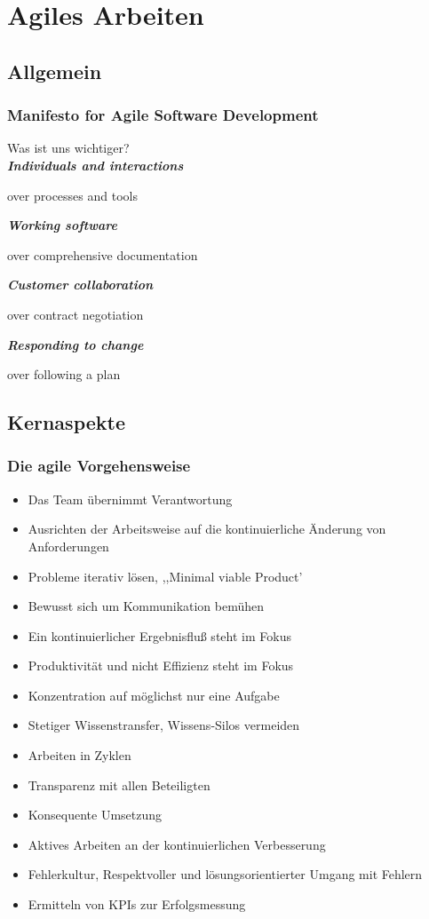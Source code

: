 \section{Agiles Arbeiten}

\subsection{Allgemein}
\frame
{
  \frametitle{Manifesto for Agile Software Development}
  Was ist uns wichtiger?\\
  \bigskip
\textbf{\textit{Individuals and interactions}}
  \begin{flushright}
  over processes and tools
  \end{flushright}
\textbf{\textit{Working software}}
  \begin{flushright}
  over comprehensive documentation
  \end{flushright}
\textbf{\textit{Customer collaboration}}
  \begin{flushright}
  over contract negotiation
  \end{flushright}
\textbf{\textit{Responding to change}}
\small
  \begin{flushright}
  over following a plan\\
  \end{flushright}
\bigskip
\small
\href{http://agilemanifesto.org}{}
\normalsize
}

\subsection{Kernaspekte}
\frame
{
  \frametitle{Die agile Vorgehensweise}
  \begin{itemize}
     \item{Das Team übernimmt Verantwortung}
     \item{Ausrichten der Arbeitsweise auf die kontinuierliche Änderung von Anforderungen}
     \item{Probleme iterativ lösen, ,,Minimal viable Product'}
     \item{Bewusst sich um Kommunikation bemühen}
     \item{Ein kontinuierlicher Ergebnisfluß steht im Fokus}
     \item{Produktivität und nicht Effizienz steht im Fokus}
     \item{Konzentration auf möglichst nur eine Aufgabe}
     \item{Stetiger Wissenstransfer, Wissens-Silos vermeiden}
     \item{Arbeiten in Zyklen}
     \item{Transparenz mit allen Beteiligten}
     \item{Konsequente Umsetzung}
     \item{Aktives Arbeiten an der kontinuierlichen Verbesserung}
     \item{Fehlerkultur, Respektvoller und lösungsorientierter Umgang mit Fehlern}
     \item{Ermitteln von KPIs zur Erfolgsmessung}
  \end{itemize}
}

